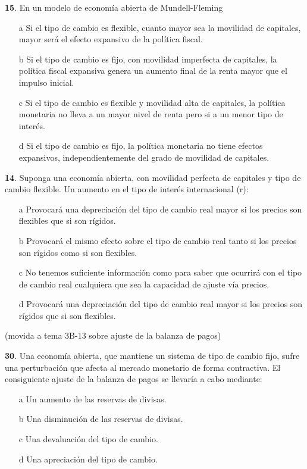 \documentclass{nuevotema}
\begin{document}
\textbf{15}. En un modelo de economía abierta de Mundell-Fleming
\begin{enumerate}
	\item[a] Si el tipo de cambio es flexible, cuanto mayor sea la movilidad de capitales, mayor será el efecto expansivo de la política fiscal.
	\item[b] Si el tipo de cambio es fijo, con movilidad imperfecta de capitales, la política fiscal expansiva genera un aumento final de la renta mayor que el impulso inicial.
	\item[c] Si el tipo de cambio es flexible y movilidad alta de capitales, la política monetaria no lleva a un mayor nivel de renta pero si a un menor tipo de interés.
	\item[d] Si el tipo de cambio es fijo, la política monetaria no tiene efectos expansivos, independientemente del grado de movilidad de capitales.
\end{enumerate}


\textbf{14}. Suponga una economía abierta, con movilidad perfecta de capitales y tipo de cambio flexible. Un aumento en el tipo de interés internacional (r):
\begin{enumerate}
	\item[a] Provocará una depreciación del tipo de cambio real mayor si los precios son flexibles que si son rígidos.
	\item[b] Provocará el mismo efecto sobre el tipo de cambio real tanto si los precios son rígidos como si son flexibles.
	\item[c] No tenemos suficiente información como para saber que ocurrirá con el tipo de cambio real cualquiera que sea la capacidad de ajuste vía precios.
	\item[d] Provocará una depreciación del tipo de cambio real mayor si los precios son rígidos que si son flexibles.
\end{enumerate}

(movida a tema 3B-13 sobre ajuste de la balanza de pagos)

\textbf{30}. Una economía abierta, que mantiene un sistema de tipo de cambio fijo, sufre una perturbación que afecta al mercado monetario de forma contractiva. El consiguiente ajuste de la balanza de pagos se llevaría a cabo mediante:
\begin{enumerate}
	\item[a] Un aumento de las reservas de divisas.
	\item[b] Una disminución de las reservas de divisas.
	\item[c] Una devaluación del tipo de cambio.
	\item[d] Una apreciación del tipo de cambio.
\end{enumerate}
\end{document}
